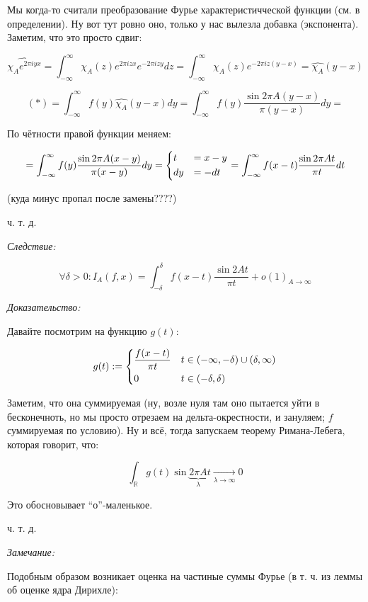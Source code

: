 \documentclass{article}
\def\goesto#1{\underset{#1}{\longrightarrow}}
\begin{document}
Мы когда-то считали преобразование Фурье характеристичческой функции (см. в определении). Ну вот тут ровно оно, только у нас вылезла добавка (экспонента). Заметим, что это просто сдвиг:

\[\widehat{\chi_Ae^{2\pi i y x}} = \int_{-\infty}^{\infty} \chi_A(z)e^{2\pi i z x}e^{- 2 \pi i z y}dz = \int_{-\infty}^{\infty} \chi_A(z)e^{-2\pi i z (y - x)} = \hat{\chi_A}(y - x)\]

\[(*) = \int_{-\infty}^{\infty} f(y) \hat{\chi_A}(y - x) dy = \int_{-\infty}^{\infty} f(y) \frac{\sin 2\pi A (y - x)}{\pi(y - x)} dy = \]

По чётности правой функции меняем:

\[ = \int_{-\infty}^{\infty} f(y) \frac{\sin 2\pi A (x - y)}{\pi(x - y)} dy = \begin{dcases}
    t &= x - y\\
    dy &= -dt
\end{dcases} = \int_{-\infty}^{\infty} f(x - t) \frac{\sin 2\pi At}{\pi t} dt\]

(куда минус пропал после замены????)

ч. т. д. 

\textit{Следствие: }

\[\forall \delta > 0: I_A(f, x) = \int_{-\delta}^{\delta} f(x - t)\frac{\sin 2At}{\pi t} + o(1)_{A \rightarrow \infty}\]

\textit{Доказательство:}

Давайте посмотрим на функцию $g(t)$:

\[g(t) := \begin{dcases}
    \frac{f(x - t)}{\pi t} &t \in (-\infty, -\delta) \cup (\delta, \infty)\\
    0 &t \in (-\delta, \delta)
\end{dcases}\]

Заметим, что она суммируемая (ну, возле нуля там оно пытается уйти в бесконечноть, но мы просто отрезаем на дельта-окрестности, и зануляем; $f$ суммируемая по условию). Ну и всё, тогда запускаем теорему Римана-Лебега, которая говорит, что:

\[\int_{\mathbb{R}} g(t)\sin \underbrace{2\pi A}_{\lambda}t \goesto{\lambda \rightarrow \infty} 0\]

Это обосновывает ``о''-маленькое.

ч. т. д.

\textit{Замечание: }

Подобным образом возникает оценка на частиные суммы Фурье (в т. ч. из леммы об оценке ядра Дирихле):
\end{document}
